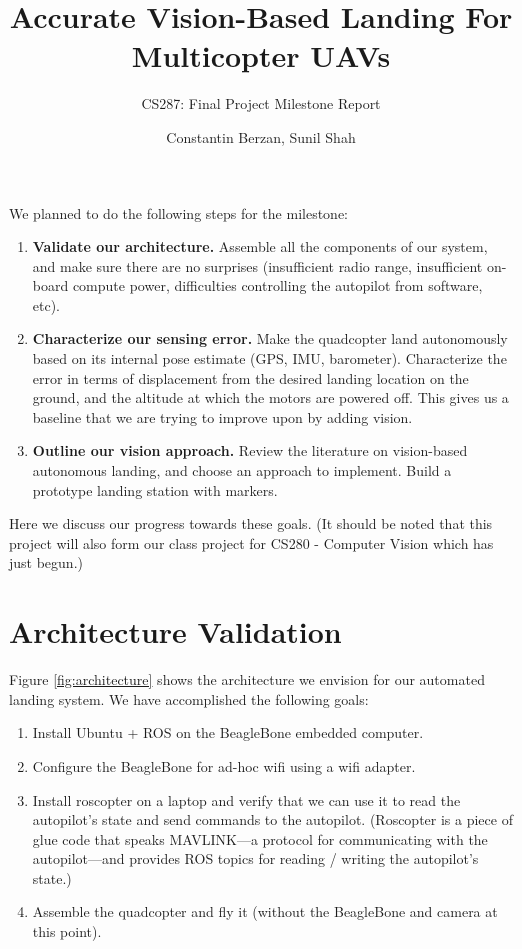 \documentclass[10pt, twocolumn]{scrartcl} %
\title{Accurate Vision-Based Landing For Multicopter UAVs}
\subtitle{CS287: Final Project Milestone Report}
\author{Constantin Berzan, Sunil Shah}
\date{}
\begin{document}
\maketitle
We planned to do the following steps for the milestone:

\begin{enumerate}

\item {\bf Validate our architecture.} Assemble all the components of our
system, and make sure there are no surprises (insufficient radio range,
insufficient on-board compute power, difficulties controlling the autopilot
from software, etc).

\item {\bf Characterize our sensing error.} Make the quadcopter land
autonomously based on its internal pose estimate (GPS, IMU, barometer).
Characterize the error in terms of displacement from the desired landing
location on the ground, and the altitude at which the motors are powered off.
This gives us a baseline that we are trying to improve upon by adding vision.

\item {\bf Outline our vision approach.} Review the literature on vision-based
autonomous landing, and choose an approach to implement. Build a prototype
landing station with markers.

\end{enumerate}

Here we discuss our progress towards these goals. (It should be noted that this project will also form our class project for CS280 - Computer Vision which has just begun.)

\section{Architecture Validation}

Figure \ref{fig:architecture} shows the architecture we envision for our
automated landing system. We have accomplished the following goals:

\begin{enumerate}
\item Install Ubuntu + ROS on the BeagleBone embedded computer.
\item Configure the BeagleBone for ad-hoc wifi using a wifi adapter.
\item Install roscopter on a laptop and verify that we can use it to read the
      autopilot's state and send commands to the autopilot. (Roscopter is a
      piece of glue code that speaks MAVLINK---a protocol for communicating
      with the autopilot---and provides ROS topics for reading / writing the
      autopilot's state.)
\item Assemble the quadcopter and fly it (without the BeagleBone and camera at
      this point).
\end{enumerate}
\end{document}

